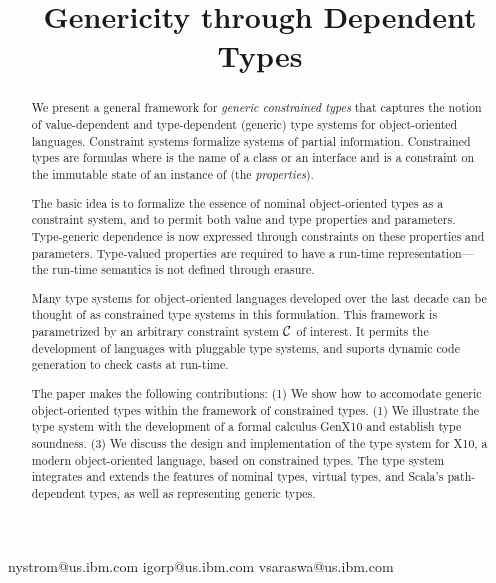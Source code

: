 \documentclass[preprint,nocopyrightspace,9pt]{sigplanconf}
\newif\iflncs
\newcommand\gxx{GenX10\xspace}
\begin{document}
\title{Genericity through Dependent Types}

\iflncs

\author{
Nathaniel Nystom\inst{1}
\and
Igor Peshansky\inst{1}
\and
Vijay Saraswat\inst{1}
}

\institute{IBM T.~J. Watson Research~Center, P.O.~Box~704, Yorktown~Heights NY 10598 USA,
\email{\{nystrom,vsaraswa\}@us.ibm.com}}

\else

  {nystrom@us.ibm.com}
  {igorp@us.ibm.com}
  {vsaraswa@us.ibm.com}


\fi

\maketitle

\begin{abstract}
We present a general framework for \emph{generic constrained types}
that captures the notion of value-dependent and
type-dependent (generic) type systems for object-oriented
languages.  Constraint systems formalize systems of partial
information.  Constrained types are formulas  where
 is the name of a class or an interface and  is a
constraint on the immutable state of an instance of  (the
{\em properties}).

The basic idea is to formalize the essence of nominal
object-oriented types as a constraint system, and to permit both
value and type properties and parameters.  Type-generic
dependence is now expressed through constraints on these
properties and parameters.  Type-valued properties are required
to have a run-time representation---the run-time semantics is
not defined through erasure.

Many type systems for object-oriented languages developed over
the last decade can be thought of as constrained type systems in
this formulation.  This framework is parametrized by an
arbitrary constraint system $\cal C$ of interest.  It permits
the development of languages with pluggable type systems, and
suports dynamic code generation to check casts at run-time.

The paper makes the following contributions: (1) We show how to
accomodate generic object-oriented types within the framework of
constrained types. (1) We illustrate the type system with the
development of a formal calculus \gxx and establish type
soundness. (3) We discuss the design and implementation of the
type system for X10, a modern object-oriented language, based on
constrained types.  The type system integrates and extends the
features of nominal types, virtual types, and
Scala's path-dependent types, as well as representing generic
types.
\end{abstract}
\end{document}
